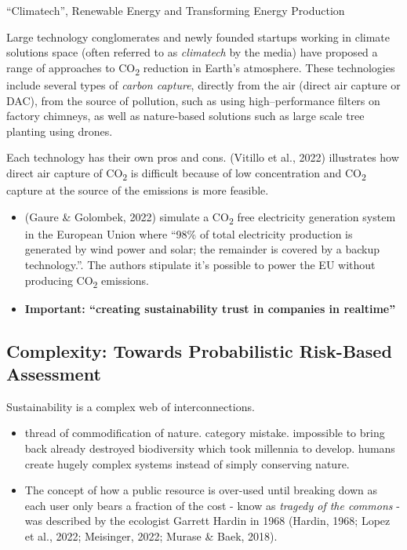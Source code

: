 \documentclass[
  letterpaper,
  DIV=11,
  numbers=noendperiod]{scrartcl}
\begin{document}
``Climatech'', Renewable Energy and Transforming Energy Production

Large technology conglomerates and newly founded startups working in
climate solutions space (often referred to as \emph{climatech} by the
media) have proposed a range of approaches to CO\textsubscript{2}
reduction in Earth's atmosphere. These technologies include several
types of \emph{carbon capture}, directly from the air (direct air
capture or DAC), from the source of pollution, such as using
high--performance filters on factory chimneys, as well as nature-based
solutions such as large scale tree planting using drones.

Each technology has their own pros and cons. (Vitillo et al., 2022)
illustrates how direct air capture of CO\textsubscript{2} is difficult
because of low concentration and CO\textsubscript{2} capture at the
source of the emissions is more feasible.

\begin{itemize}
\item
  (Gaure \& Golombek, 2022) simulate a CO\textsubscript{2} free
  electricity generation system in the European Union where ``98\% of
  total electricity production is generated by wind power and solar; the
  remainder is covered by a backup technology.''. The authors stipulate
  it's possible to power the EU without producing CO\textsubscript{2}
  emissions.
\item
  \textbf{Important: ``creating sustainability trust in companies in
  realtime''}
\end{itemize}

\subsection{Complexity: Towards Probabilistic Risk-Based
Assessment}\label{complexity-towards-probabilistic-risk-based-assessment}

Sustainability is a complex web of interconnections.

\begin{itemize}
\item
  thread of commodification of nature. category mistake. impossible to
  bring back already destroyed biodiversity which took millennia to
  develop. humans create hugely complex systems instead of simply
  conserving nature.
\item
  The concept of how a public resource is over-used until breaking down
  as each user only bears a fraction of the cost - know as \emph{tragedy
  of the commons} -was described by the ecologist Garrett Hardin in 1968
  (Hardin, 1968; Lopez et al., 2022; Meisinger, 2022; Murase \& Baek,
  2018).
\end{itemize}
\end{document}
